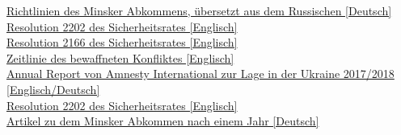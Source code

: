 \documentclass[a4paper,11pt]{article}
\begin{document}
\href{https://www.welt.de/newsticker/dpa_nt/infoline_nt/thema_nt/article131986171/Das-Minsker-OSZE-Protokoll-fuer-eine-Feuerpause.html}{Richtlinien des Minsker Abkommens, übersetzt aus dem Russischen [Deutsch]} \\ \href{http://www.securitycouncilreport.org/atf/cf/\%7B65BFCF9B-6D27-4E9C-8CD3-CF6E4FF96FF9\%7D/s_res_2202.pdf}{Resolution 2202 des Sicherheitsrates [Englisch]} \\ \href{http://www.securitycouncilreport.org/atf/cf/\%7B65BFCF9B-6D27-4E9C-8CD3-CF6E4FF96FF9\%7D/s_res_2166.pdf}{Resolution 2166 des Sicherheitsrates [Englisch]} \\ \href{https://www.bbc.com/news/world-europe-18010123}{Zeitlinie des bewaffneten Konfliktes [Englisch]} \\ \href{https://www.amnesty.de/jahresbericht/2018/ukraine}{Annual Report von Amnesty International zur Lage in der Ukraine 2017/2018 [Englisch/Deutsch]} \\ \href{http://www.securitycouncilreport.org/atf/cf/\%7B65BFCF9B-6D27-4E9C-8CD3-CF6E4FF96FF9\%7D/s_res_2202.pdf}{Resolution 2202 des Sicherheitsrates [Englisch]} \\ \href{https://www.zeit.de/politik/ausland/2016-02/minsk-2-ukraine-putin-russland-grenze-abkommen-krieg-frieden}{Artikel zu dem Minsker Abkommen nach einem Jahr [Deutsch]} \\
 
\end{document}
